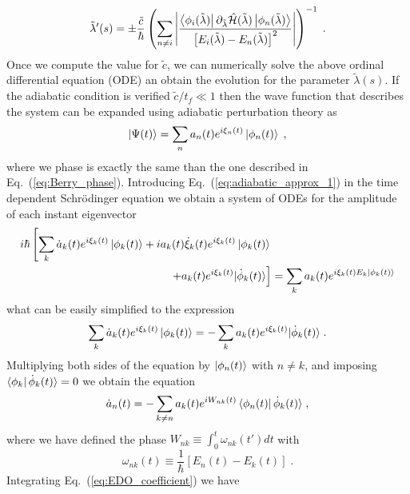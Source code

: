 \begin{equation}
\tilde{\lambda}'(s)=\pm \frac{\tilde{c}}{\hbar}\left(\sum_{n\neq i}\abs{\frac{\bra{\phi_i(\tilde{\lambda})}\partial_{\tilde{\lambda}} \hat{\mathcal{H}}(\tilde{\lambda})\ket{\phi_n(\tilde{\lambda})}}{\left[E_i(\tilde{\lambda})-E_n(\tilde{\lambda})\right]^2}}\right)^{-1}\; .
\label{eq:parameter_ODE_2}
\end{equation}
Once we compute the value for $\tilde{c}$, we can numerically solve the above ordinal differential equation (ODE) an obtain the evolution for the parameter $\tilde{\lambda}(s)$. If the adiabatic condition is verified $\tilde{c}/t_f\ll 1$ then the wave function that describes the system can be expanded using adiabatic perturbation theory as
\begin{equation}
	\ket{\Psi(t)}=\sum_na_n(t)e^{i\xi_n(t)}\ket{\phi_n(t)}\; ,
	\label{eq:adiabatic_approx_1}
\end{equation}
where we phase is exactly the same than the one described in Eq.~(\ref{eq:Berry_phase}). Introducing Eq.~(\ref{eq:adiabatic_approx_1}) in the time dependent Schrödinger equation we obtain a system of ODEs for the amplitude of each instant eigenvector
\begin{equation}
	\begin{split}
	i\hbar\left[\sum_k\dot{a}_k(t)e^{i\xi_k(t)}\ket{\phi_k(t)}+ia_k(t)\dot{\xi}_k(t)e^{i\xi_k(t)}\ket{\phi_k(t)}\right.&\\
	\left.+a_k(t)e^{i\xi_k(t)}|\dot{\phi}_k(t)\rangle\right]&=\sum_k a_k(t)e^{i\xi_k(t)E_k\ket{\phi_k(t)}}
	\end{split}
\end{equation}
what can be easily simplified to the expression
\begin{equation}
	\sum_k \dot{a}_k(t)e^{i\xi_k(t)}\ket{\phi_k(t)}=-\sum_ka_k(t)e^{i\xi_k(t)}|\dot{\phi}_k(t)\rangle\; .
\end{equation}
Multiplying both sides of the equation by $\ket{\phi_n(t)}$ with $n\neq k$, and imposing $\bra{\phi_k}\dot{\phi}_k(t)\rangle=0$ we obtain the equation
\begin{equation}
	\dot{a}_n(t)=-\sum_{k\neq n}a_k(t)e^{iW_{nk}(t)}\bra{\phi_n(t)}\dot{\phi}_k(t)\rangle\; ,
	\label{eq:EDO_coefficient}
\end{equation}
where we have defined the phase $W_{nk}\equiv \int_0^t\omega_{nk}(t')dt$ with
\begin{equation}
	\omega_{nk}(t)\equiv \frac{1}{\hbar}[E_n(t)-E_k(t)]\; .
\end{equation}
Integrating Eq.~(\ref{eq:EDO_coefficient}) we have
